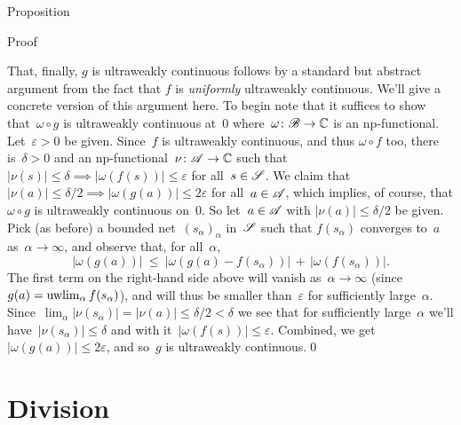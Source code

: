 \documentclass[a]{subfiles}
\begin{document}
\begin{parsec}
\begin{point}[vn-extension]{Proposition}
\begin{point}{Proof}
\begin{point}
That, finally, $g$ is ultraweakly continuous
follows by a standard but abstract argument from the fact
that $f$ is \emph{uniformly} ultraweakly continuous.
We'll give a concrete version of this argument here.
To begin note that it suffices to show that~$\omega\circ g$
is ultraweakly continuous
at~$0$
where~$\omega\colon \mathscr{B}\to\mathbb{C}$
is an np-functional.
Let~$\varepsilon>0$ be given.
Since~$f$ 
is ultraweakly continuous,
and 
thus $\omega\circ f$ too,
there is~$\delta>0$ and an np-functional~$\nu\colon \mathscr{A}\to\mathbb{C}$
such that $\left|\nu(s)\right|\leq \delta \implies 
\left|\omega(f(s))\right|\leq \varepsilon$
for all~$s\in\mathscr{S}$.
We claim that $\left|\nu(a)\right|\leq \delta/2 \implies
\left|\omega(g(a))\right|\leq 2\varepsilon$
for all~$a\in\mathscr{A}$,
which implies, of course,
that $\omega\circ g$ is ultraweakly continuous on~$0$.
So let~$a\in\mathscr{A}$ with $\left|\nu(a)\right|\leq \delta/2$
be given.
Pick (as before) a bounded net~$(s_\alpha)_\alpha$
in~$\mathscr{S}$
such that $f(s_\alpha)$
converges to~$a$ as~$\alpha\to\infty$, and observe that,
for all~$\alpha$,
\begin{equation*}
\left|\omega(g (a))\right|
\ \leq\ 
\left|\omega(g(a)-f(s_\alpha))\right|
\,+\,\left|\omega(f(s_\alpha))\right|.
\end{equation*}
The first term on the right-hand side above will 
vanish as~$\alpha\to\infty$ (since 
$g (a)=\uwlim_\alpha f (s_\alpha)$),
and will thus be smaller than~$\varepsilon$ 
for sufficiently large~$\alpha$.
Since~$\lim_\alpha \left|\nu(s_\alpha)\right|=\left|\nu(a)\right|
\leq \delta/2<\delta$
we see 
that for sufficiently large~$\alpha$
we'll have~$\left|\nu(s_\alpha)\right|\leq \delta$ 
and with it~$\left|\omega(f (s))\right|\leq \varepsilon$.
Combined,
we get $\left|\omega(g (a))\right|\leq 2\varepsilon$,
and so~$g$ is ultraweakly continuous.\qed
\end{point}

\end{point}
\end{point}
\end{parsec}
\section{Division}
\label{S:division}
\end{document}
